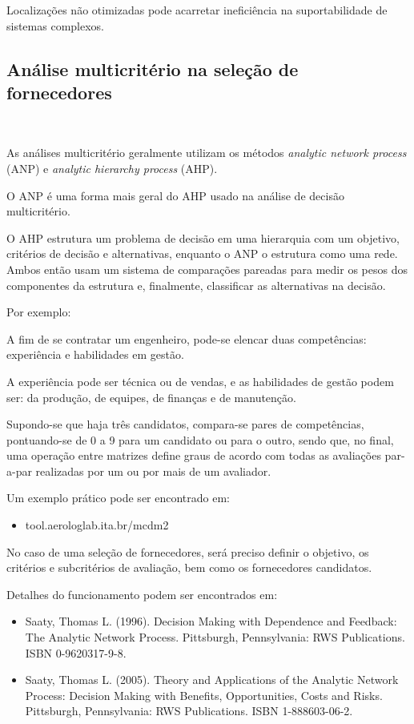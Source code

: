 \documentclass{amsart}
\begin{document}
Localizações não otimizadas pode acarretar ineficiência na suportabilidade de sistemas complexos.

\subsection{Análise multicritério na seleção de fornecedores}\

As análises multicritério geralmente utilizam os métodos {\it analytic network process} (ANP) e {\it analytic hierarchy process} (AHP).

O ANP é uma forma mais geral do AHP usado na análise de decisão multicritério.

O AHP estrutura um problema de decisão em uma hierarquia com um objetivo, critérios de decisão e alternativas, enquanto o ANP o estrutura como uma rede. Ambos então usam um sistema de comparações pareadas para medir os pesos dos componentes da estrutura e, finalmente, classificar as alternativas na decisão.

Por exemplo:

A fim de se contratar um engenheiro, pode-se elencar duas competências: experiência e habilidades em gestão.

A experiência pode ser técnica ou de vendas, e as habilidades de gestão podem ser: da produção, de equipes, de finanças e de manutenção.

Supondo-se que haja três candidatos, compara-se pares de competências, pontuando-se de 0 a 9 para um candidato ou para o outro, sendo que, no final, uma operação entre matrizes define graus de acordo com todas as avaliações par-a-par realizadas por um ou por mais de um avaliador.

Um exemplo prático pode ser encontrado em:

\begin{itemize}
\item tool.aerologlab.ita.br/mcdm2
\end{itemize}

No caso de uma seleção de fornecedores, será preciso definir o objetivo, os critérios e subcritérios de avaliação, bem como os fornecedores candidatos.

Detalhes do funcionamento podem ser encontrados em:

\begin{itemize}
\item Saaty, Thomas L. (1996). Decision Making with Dependence and Feedback: The Analytic Network Process. Pittsburgh, Pennsylvania: RWS Publications. ISBN 0-9620317-9-8.

\item Saaty, Thomas L. (2005). Theory and Applications of the Analytic Network Process: Decision Making with Benefits, Opportunities, Costs and Risks. Pittsburgh, Pennsylvania: RWS Publications. ISBN 1-888603-06-2.
\end{itemize}
\end{document}
